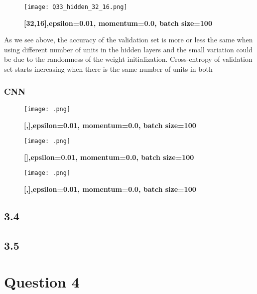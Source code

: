 \documentclass[10pt]{article}
\begin{document}
\begin{figure}[H]
	\centering
	\texttt{[image: Q33\_hidden\_32\_16.png]}
	\caption{\textbf{[32,16],epsilon=0.01, momentum=0.0, batch size=100}}
	\label{fig:}
\end{figure}

As we see above, the accuracy of the validation set is more or less the same when using different number of units in the hidden layers and the small variation could be due to the randomness of the weight initialization. Cross-entropy of validation set starts increasing when there is the same number of units in both 


\subsubsection*{CNN}

\begin{figure}[H]
	\centering
	\texttt{[image: .png]}
	\caption{\textbf{[,],epsilon=0.01, momentum=0.0, batch size=100}}
	\label{fig:}
\end{figure}


\begin{figure}[H]
	\centering
	\texttt{[image: .png]}
	\caption{\textbf{[],epsilon=0.01, momentum=0.0, batch size=100}}
	\label{fig:}
\end{figure}


\begin{figure}[H]
	\centering
	\texttt{[image: .png]}
	\caption{\textbf{[,],epsilon=0.01, momentum=0.0, batch size=100}}
	\label{fig:}
\end{figure}




\subsection*{3.4}

\subsection*{3.5}

\section*{Question 4}
\end{document}

